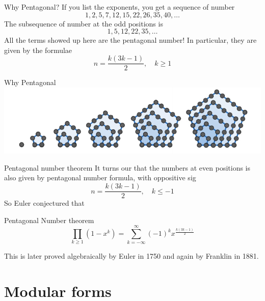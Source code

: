 \documentclass[pdf]{beamer}
\begin{document}
\begin{frame}{Why Pentagonal?}
    If you list the exponents, you get a sequence of number
    \[1, 2,5,7,12,15,22,26,35,40,\ldots\]\pause
    The subsequence of number at the odd positions is
    \[1, 5, 12, 22,35,\ldots \]\pause
    All the terms showed up here are the pentagonal number! In particular, they are given by the formulae
    \[ n = \dfrac{k(3k-1)}{2}, \quad k \ge 1\]

\end{frame}
\begin{frame}{Why Pentagonal}
    \includegraphics{The first six pentagonal number}
\end{frame}
\begin{frame}{Pentagonal number theorem}
    It turns our that the numbers at even positions is also given by pentagonal number formula, with oppositive sig
    \[n = \dfrac{k(3k-1)}{2}, \quad k \le -1\]
    So  Euler conjectured that
    \begin{block}{Pentagonal Number theorem}
        \[\prod_{k \ge 1} (1-x^k) = \sum_{k=-\infty}^\infty (-1)^kx^{\frac{k(3k-1)}{2}}\]
    \end{block}\pause
    This is later proved algebraically by Euler in 1750 and again by Franklin in 1881.
\end{frame}
\section{Modular forms}
\end{document}
